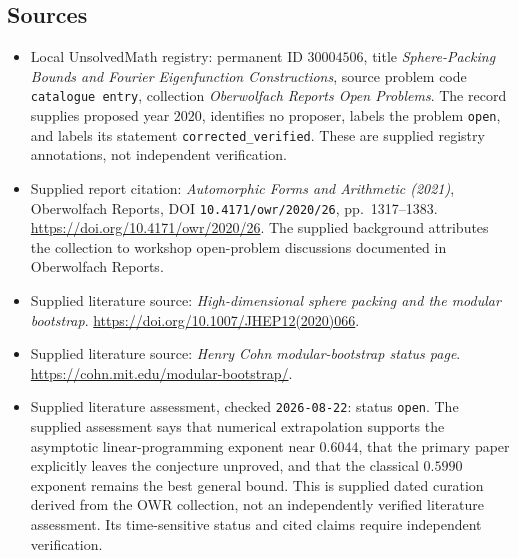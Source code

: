\documentclass[11pt]{article}
\begin{document}
\subsection{Sources}
\begin{itemize}
\item Local UnsolvedMath registry: permanent ID \(30004506\), title \emph{Sphere-Packing Bounds and Fourier Eigenfunction Constructions}, source problem code \texttt{catalogue entry}, collection \emph{Oberwolfach Reports Open Problems}. The record supplies proposed year \(2020\), identifies no proposer, labels the problem \texttt{open}, and labels its statement \texttt{corrected\_verified}. These are supplied registry annotations, not independent verification.
\item Supplied report citation: \emph{Automorphic Forms and Arithmetic (2021)}, Oberwolfach Reports, DOI \texttt{10.4171/owr/2020/26}, pp.~1317--1383. \url{https://doi.org/10.4171/owr/2020/26}. The supplied background attributes the collection to workshop open-problem discussions documented in Oberwolfach Reports.
\item Supplied literature source: \emph{High-dimensional sphere packing and the modular bootstrap}. \url{https://doi.org/10.1007/JHEP12(2020)066}.
\item Supplied literature source: \emph{Henry Cohn modular-bootstrap status page}. \url{https://cohn.mit.edu/modular-bootstrap/}.
\item Supplied literature assessment, checked \texttt{2026-08-22}: status \texttt{open}. The supplied assessment says that numerical extrapolation supports the asymptotic linear-programming exponent near \(0.6044\), that the primary paper explicitly leaves the conjecture unproved, and that the classical \(0.5990\) exponent remains the best general bound. This is supplied dated curation derived from the OWR collection, not an independently verified literature assessment. Its time-sensitive status and cited claims require independent verification.
\end{itemize}
\end{document}
